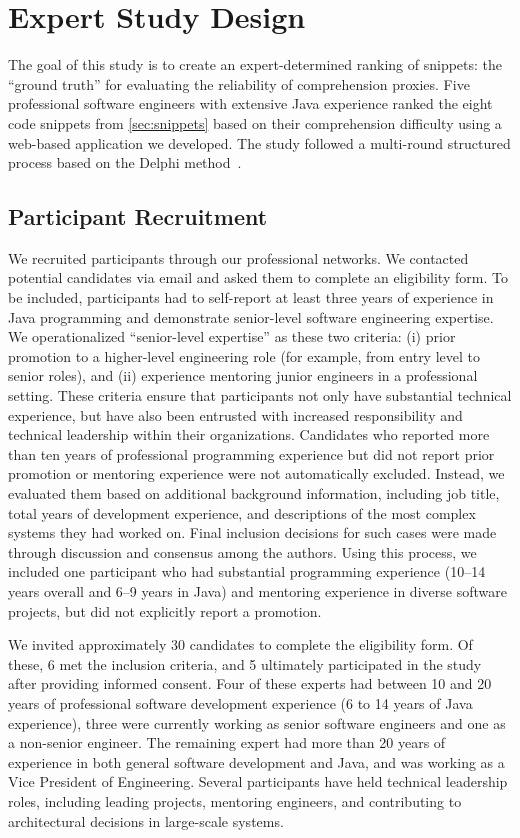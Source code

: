  
\section{Expert Study Design}
\label{sec:expert-study}
The goal of this study is to create an expert-determined ranking of snippets: the ``ground truth'' for evaluating the reliability of comprehension proxies.
Five professional software engineers with extensive Java experience ranked the eight code snippets from \cref{sec:snippets} based on their comprehension difficulty using a web-based application we developed.
The study followed a multi-round structured process based on the Delphi method~\cite{delphi,delphiOriginal,randManual}.

\subsection{Participant Recruitment}
\label{sec:expert-participants}
We recruited participants through our professional networks. We contacted potential candidates via email and asked them to complete an eligibility form. To be included, participants had to self-report at least three years of experience in Java programming and demonstrate senior-level software engineering expertise.
We operationalized ``senior-level expertise'' as these two criteria: (i) prior promotion to a higher-level engineering role (for example, from entry level to senior roles), and (ii) experience mentoring junior engineers in a professional setting. These criteria ensure that participants not only have substantial technical experience, but have also been entrusted with increased responsibility and technical leadership within their organizations.
Candidates who reported more than ten years of professional programming experience but did not report prior promotion or mentoring experience were not automatically excluded. Instead, we evaluated them based on additional background information, including job title, total years of development experience, and descriptions of the most complex systems they had worked on. Final inclusion decisions for such cases were made through discussion and consensus among the authors. Using this process, we included one participant who had substantial programming experience (10–14 years overall and 6–9 years in Java) and mentoring experience in diverse software projects, but did not explicitly report a  promotion.

We invited approximately 30 candidates to complete the eligibility form. Of these, 6 met the inclusion criteria, and 5 ultimately participated in the study after providing informed consent.
Four of these experts had between 10 and 20 years of professional software development experience (6 to 14 years of Java experience), three were currently working as senior software engineers and one as a non-senior engineer. The remaining expert had more than 20 years of experience in both general software development and Java, and was working as a Vice President of Engineering. Several participants have held technical leadership roles, including leading projects, mentoring engineers, and contributing to architectural decisions in large-scale systems.


